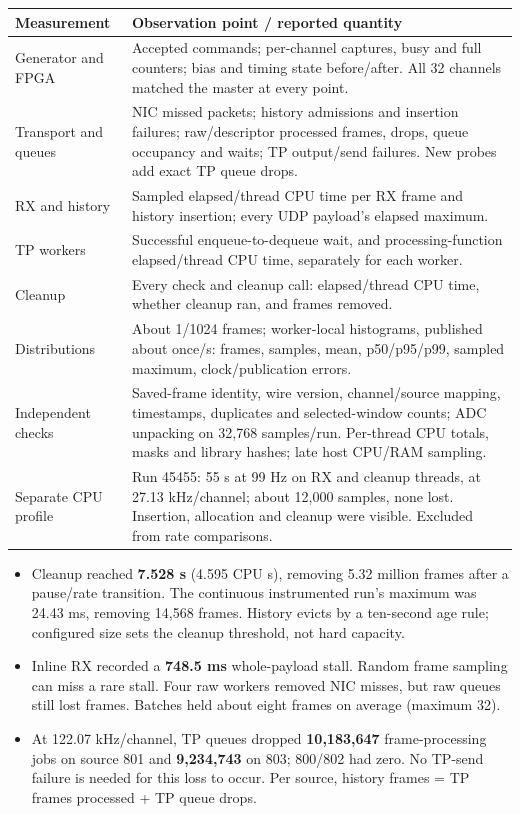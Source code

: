 \documentclass[10pt,a4paper]{article}
\newcommand{\heading}[1]{\par\vspace{5pt}{\large\bfseries #1}\par\vspace{2pt}}
\begin{document}
\heading{All measurements collected}
{\small\begin{tabularx}{\linewidth}{@{}p{37mm}Y@{}}\toprule
Measurement & Observation point / reported quantity \\\midrule
Generator and FPGA & Accepted commands; per-channel captures, busy and full counters; bias and timing state before/after. All 32 channels matched the master at every point. \\
Transport and queues & NIC missed packets; history admissions and insertion failures; raw/descriptor processed frames, drops, queue occupancy and waits; TP output/send failures. New probes add exact TP queue drops. \\
RX and history & Sampled elapsed/thread CPU time per RX frame and history insertion; every UDP payload's elapsed maximum. \\
TP workers & Successful enqueue-to-dequeue wait, and processing-function elapsed/thread CPU time, separately for each worker. \\
Cleanup & Every check and cleanup call: elapsed/thread CPU time, whether cleanup ran, and frames removed. \\
Distributions & About 1/1024 frames; worker-local histograms, published about once/s: frames, samples, mean, p50/p95/p99, sampled maximum, clock/publication errors. \\
Independent checks & Saved-frame identity, wire version, channel/source mapping, timestamps, duplicates and selected-window counts; ADC unpacking on 32,768 samples/run. Per-thread CPU totals, masks and library hashes; late host CPU/RAM sampling. \\
Separate CPU profile & Run 45455: 55 s at 99 Hz on RX and cleanup threads, at 27.13 kHz/channel; about 12,000 samples, none lost. Insertion, allocation and cleanup were visible. Excluded from rate comparisons. \\\bottomrule
\end{tabularx}}

\heading{What the measurements establish}
\begin{itemize}
\item Cleanup reached \textbf{7.528 s} (4.595 CPU s), removing 5.32 million frames after a pause/rate transition. The continuous instrumented run's maximum was 24.43 ms, removing 14,568 frames. History evicts by a ten-second age rule; configured size sets the cleanup threshold, not hard capacity.
\item Inline RX recorded a \textbf{748.5 ms} whole-payload stall. Random frame sampling can miss a rare stall. Four raw workers removed NIC misses, but raw queues still lost frames. Batches held about eight frames on average (maximum 32).
\item At 122.07 kHz/channel, TP queues dropped \textbf{10,183,647} frame-processing jobs on source 801 and \textbf{9,234,743} on 803; 800/802 had zero. No TP-send failure is needed for this loss to occur. Per source, history frames = TP frames processed + TP queue drops.
\end{itemize}
\end{document}
